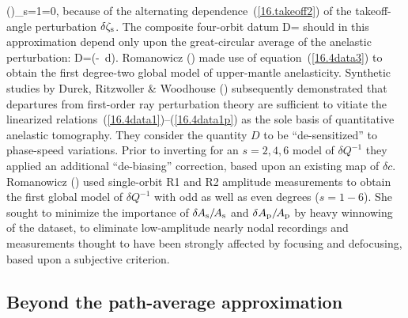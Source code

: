 \left(\right)_{s=1}=0,
\en
because of the alternating
dependence~(\ref{16.takeoff2}) of the takeoff-angle
perturbation $\delta\zeta_{\rm s}$.
The composite four-orbit datum
\eq \label{16.4data2}
D=\times
{}
\en
should in this approximation depend only upon the
great-circular average of the anelastic perturbation:
\eq \label{16.4data3}
\delta D=\exp\left(-\oint
{}\,d\Delta\right).
\en
Romanowicz (\citeyear{romanowicz90}) made use of
equation~(\ref{16.4data3}) to obtain the first
degree-two global model of upper-mantle anelasticity.
Synthetic studies by Durek, Ritzwoller \& Woodhouse
(\citeyear{durek&al93}) subsequently demonstrated that
departures from first-order ray perturbation theory
are sufficient to vitiate the linearized
relations~(\ref{16.4data1})--(\ref{16.4data1p})
as the sole basis of quantitative anelastic tomography.
They consider the quantity $D$ to be ``de-sensitized''
to phase-speed variations.  Prior to inverting for an
$s=2,4,6$ model of $\delta Q^{-1}$ they applied an additional
``de-biasing'' correction, based upon an existing map of
$\delta c$.  Romanowicz (\citeyear{romanowicz95}) used
single-orbit R1 and R2 amplitude measurements to obtain
the first global model of $\delta Q^{-1}$ with odd as
well as even degrees ($s=1\!-\!6$).
She sought to minimize the importance of
$\delta\hspace{-0.2 mm}A_{\rm s}/\hspace{-0.4 mm}A_{\rm s}$
and $\delta A_{\rm p}/\hspace{-0.4 mm}A_{\rm p}$
by heavy winnowing of the dataset, to eliminate
low-amplitude nearly nodal recordings and
measurements thought to have been strongly
affected by focusing and defocusing,
based upon a subjective criterion.
%
%

\subsection{Beyond the path-average approximation}

